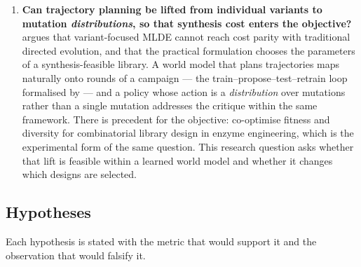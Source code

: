 \documentclass[12pt, a4paper]{article}
\begin{document}
\begin{enumerate}
    \item \textbf{Can trajectory planning be lifted from individual variants to mutation \textit{distributions}, so that synthesis cost enters the objective?} \citet{wittmann2026retrospective} argues that variant-focused MLDE cannot reach cost parity with traditional directed evolution, and that the practical formulation chooses the parameters of a synthesis-feasible library. A world model that plans trajectories maps naturally onto rounds of a campaign --- the train--propose--test--retrain loop formalised by \citet{hie2022adaptive} --- and a policy whose action is a \textit{distribution} over mutations rather than a single mutation addresses the critique within the same framework. There is precedent for the objective: \citet{ding2024cooptimization} co-optimise fitness and diversity for combinatorial library design in enzyme engineering, which is the experimental form of the same question. This research question asks whether that lift is feasible within a learned world model and whether it changes which designs are selected.
\end{enumerate}

\subsection{Hypotheses}

Each hypothesis is stated with the metric that would support it and the observation that would falsify it.
\end{document}
